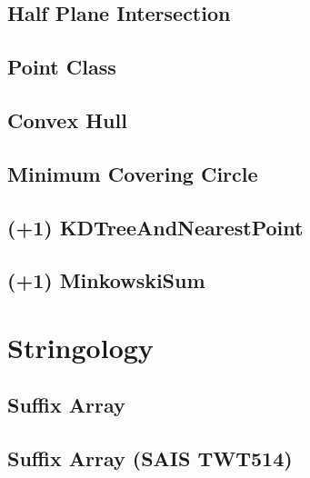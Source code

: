\documentclass[10pt,twocolumn,oneside]{article}
\begin{document}
\subsection{Half Plane Intersection}


\subsection{Point Class}


\subsection{Convex Hull}


\subsection{Minimum Covering Circle}


\subsection{(+1) KDTreeAndNearestPoint}


\subsection{(+1) MinkowskiSum}


\section{Stringology}
\subsection{Suffix Array}


\subsection{Suffix Array (SAIS TWT514)}

\end{document}
